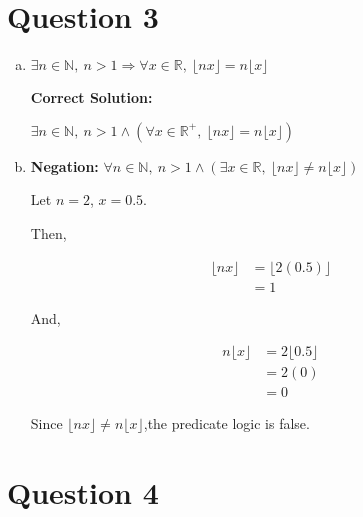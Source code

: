 \documentclass[12pt]{article}
\begin{document}
\section*{Question 3}
\begin{enumerate}[a.]
    \item

    $\exists n \in \mathbb{N},\: n > 1 \Rightarrow \forall x \in \mathbb{R},\:
    \lfloor nx \rfloor = n \lfloor x \rfloor$

    \bigskip

    \textbf{Correct Solution:}

    $\exists n \in \mathbb{N},\:n>1 \land (\forall x \in \mathbb{R}^{+},\:
    \lfloor nx \rfloor = n \lfloor x \rfloor)$

    \item

    \textbf{Negation:} $\forall n \in \mathbb{N},\: n > 1 \land (\exists x \in
    \mathbb{R},\: \lfloor nx \rfloor \neq n \lfloor x \rfloor)$

    \bigskip

    Let $n = 2$, $x = 0.5$.

    \bigskip

    Then,

    \begin{align}
        \lfloor nx \rfloor &= \lfloor 2(0.5) \rfloor\\
        &= 1
    \end{align}

    And,

    \begin{align}
        n \lfloor x \rfloor &= 2 \lfloor 0.5 \rfloor\\
        &= 2(0)\\
        &= 0
    \end{align}

    Since $\lfloor nx \rfloor \neq n \lfloor x \rfloor$,the predicate logic is
    false.


\end{enumerate}

\section*{Question 4}
\end{document}
